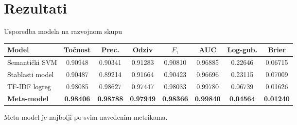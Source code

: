 \documentclass[aspectratio=169]{beamer}
\begin{document}
\section{Rezultati}

\begin{frame}{Usporedba modela na razvojnom skupu}
    \centering
    \scriptsize
    \setlength{\tabcolsep}{3.4pt}
    \begin{tabular}{@{}lccccccc@{}}
        \toprule
        \textbf{Model} & \textbf{Točnost} & \textbf{Prec.} & \textbf{Odziv} & \textbf{$F_1$} & \textbf{AUC} & \textbf{Log-gub.} & \textbf{Brier} \\ \midrule
        Semantički SVM & 0.90948 & 0.90341 & 0.91283 & 0.90810 & 0.96885 & 0.22646 & 0.06715 \\
        Stablasti model & 0.90487 & 0.89214 & 0.91664 & 0.90423 & 0.96696 & 0.23115 & 0.07009 \\
        TF-IDF logreg & 0.98085 & 0.98627 & 0.97447 & 0.98033 & 0.99780 & 0.06739 & 0.01626 \\
        \midrule
        \textbf{Meta-model} & \textbf{0.98406} & \textbf{0.98788} & \textbf{0.97949} & \textbf{0.98366} & \textbf{0.99840} & \textbf{0.04564} & \textbf{0.01240} \\ \bottomrule
    \end{tabular}

    \vspace{3mm}
    \small Meta-model je najbolji po svim navedenim metrikama.
\end{frame}
\end{document}
